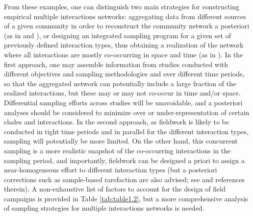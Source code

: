 From these examples, one can distinguish two main strategies for constructing empirical multiple interactions networks: aggregating data from different sources of a given community in order to reconstruct the community network a posteriori (as in \citealt{Melian2009, Hechinger2011, Kefi2015} and \citealt{Sander2015}), or designing an integrated sampling program for a given set of previously defined interaction types, thus obtaining a realization of the network where all interactions are mostly co-occurring in space and time (as in \citealt{Pocock2012}). In the first approach, one may assemble information from studies conducted with different objectives and sampling methodologies and over different time periods, so that the aggregated network can potentially include a large fraction of the realized interactions, but these may or may not co-occur in time and/or space. Differential sampling efforts across studies will be unavoidable, and a posteriori analyses should be considered to minimize over or under-representation of certain clades and interactions. In the second approach, as fieldwork is likely to be conducted in tight time periods and in parallel for the different interaction types, sampling will potentially be more limited. On the other hand, this concurrent sampling is a more realistic snapshot of the co-occurring interactions in the sampling period, and importantly, fieldwork can be designed a priori to assign a near-homogeneous effort to different interaction types (but a posteriori corrections such as sample-based rarefaction are also advised; see \citealt{Pocock2012} and references therein). A non-exhaustive list of factors to account for the design of field campaigns is provided in Table \ref{tab:table1.2}, but a more comprehensive analysis of sampling strategies for multiple interactions networks is needed.

